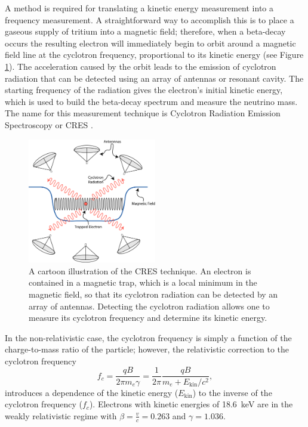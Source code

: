 A method is required for translating a kinetic energy measurement into a frequency measurement. A straightforward way to accomplish this is to place a gaseous supply of tritium into a magnetic field; therefore, when a beta-decay occurs the resulting electron will immediately begin to orbit around a magnetic field line at the cyclotron frequency, proportional to its kinetic energy (see Figure \ref{fig:chap3-cres-cartoon}). The acceleration caused by the orbit leads to the emission of cyclotron radiation that can be detected using an array of antennas or resonant cavity. The starting frequency of the radiation gives the electron's initial kinetic energy, which is used to build the beta-decay spectrum and measure the neutrino mass. The name for this measurement technique is Cyclotron Radiation Emission Spectroscopy or CRES \cite{p8originalcres}.

\begin{figure}[htbp]
    \centering
    \includegraphics[width=0.5\textwidth]{figs/Chapter-3/230303_cres_cartoon.png}
    \caption{A cartoon illustration of the CRES technique. An electron is contained in a magnetic trap, which is a local minimum in the magnetic field, so that its cyclotron radiation can be detected by an array of antennas. Detecting the cyclotron radiation allows one to measure its cyclotron frequency and determine its kinetic energy.}
    \label{fig:chap3-cres-cartoon}
\end{figure}

In the non-relativistic case, the cyclotron frequency is simply a function of the charge-to-mass ratio of the particle; however, the relativistic correction to the cyclotron frequency
\begin{equation}
    f_c = \frac{qB}{2\pi m_e\gamma}=\frac{1}{2\pi}\frac{qB}{m_e+E_\mathrm{kin}/c^2},
    \label{eq:chap3-cyclotron-freq}
\end{equation} 
introduces a dependence of the kinetic energy ($E_\mathrm{kin}$) to the inverse of the cyclotron frequency ($f_c$). Electrons with kinetic energies of 18.6~keV are in the weakly relativistic regime with $\beta=\frac{v}{c}=0.263$ and $\gamma=1.036$.


